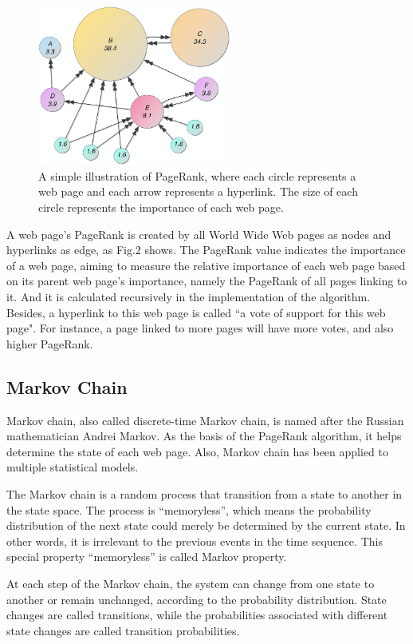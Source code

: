 \documentclass[lettersize,journal,12pt,conference]{IEEEtran}
\begin{document}
\begin{figure}[h]
	\centering
	\includegraphics[width=2.5in]{images/fig3.jpeg}
	\caption{A simple illustration of PageRank, where each circle represents a web page and each arrow represents a hyperlink. The size of each circle represents the importance of each web page.}
	\label{fig3}
\end{figure}

A web page's PageRank is created by all World Wide Web pages as nodes and hyperlinks as edge, as Fig.2 shows. The PageRank value indicates the importance of a web page, aiming to measure the relative importance of each web page based on its parent web page's importance, namely the PageRank of all pages linking to it. And it is calculated recursively in the implementation of the algorithm. Besides, a hyperlink to this web page is called ``a vote of support for this web page". For instance, a page linked to more pages will have more votes, and also higher PageRank.

\subsection{Markov Chain}

Markov chain, also called discrete-time Markov chain, is named after the Russian mathematician Andrei Markov. As the basis of the PageRank algorithm, it helps determine the state of each web page. Also, Markov chain has been applied to multiple statistical models.

The Markov chain is a random process that transition from a state to another in the state space. The process is ``memoryless'', which means the probability distribution of the next state could merely be determined by the current state. In other words, it is irrelevant to the previous events in the time sequence. This special property ``memoryless'' is called Markov property.

At each step of the Markov chain, the system can change from one state to another or remain unchanged, according to the probability distribution. State changes are called transitions, while the probabilities associated with different state changes are called transition probabilities.
\end{document}
